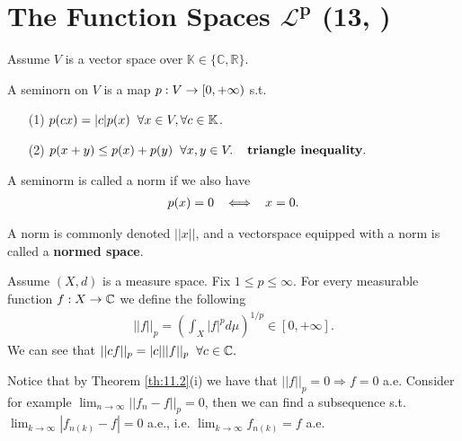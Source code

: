 \section{The Function Spaces \(\boldsymbol{\mathcal{L}^p}\) \tiny{(13, \cite{schilling2017measures})}}
Assume $V$ is a vector space over $\mathbb K\in\{\mathbb C,\mathbb R\}$.

\begin{definition}
    A seminorn on $V$ is a map $p:V\rightarrow [0,+\infty)$ s.t. 
    \begin{itemize}
        \item[(1)] $p(cx)=|c|p(x)\hspace{2mm} \forall x\in V,\forall c\in \mathbb K$.
        \item[(2)] $p(x+y)\leq p(x) +p(y)\hspace{2mm} \forall x,y\in V. \hspace{4mm} \textbf{triangle inequality}. $
    \end{itemize}
    A seminorm is called a norm if we also have \begin{align*}
        p(x)=0\hspace{2mm} \iff \hspace{2mm} x=0.
    \end{align*}
\end{definition}

A norm is commonly denoted $||x||$, and a vectorspace equipped with a norm is called a \textbf{normed space}.


\begin{definition}
    Assume $(X,d)$ is a measure space. Fix $1\leq p\leq \infty.$ For every measurable function $f:X\rightarrow \mathbb{C}$ we define the following
    \begin{align}
        ||f||_p = \left( \int_X |f|^p d\mu\right)^{1/p}\in [0,+\infty].
    \end{align} 
    We can see that $||cf||_p=|c|||f||_p\hspace{2mm} \forall c\in\mathbb{C}.$ 
    
    Notice that by Theorem \ref{th:11.2}(i) we have that \(||f||_p=0\Rightarrow 
    f=0\) a.e. Consider for example \(\lim_{n\rightarrow\infty}||f_n-f||_p=0\), then we can find a subsequence s.t. 
    \(\lim_{k\rightarrow\infty}|f_{n(k)}-f|=0\) a.e., i.e.
    \(\lim_{k\rightarrow\infty}f_{n(k)} = f\) a.e. 
\end{definition}

